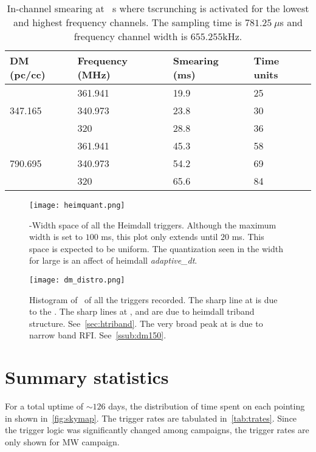 \begin{table}
	\label{tab:dmsmearing}
	\caption{In-channel smearing at \dm~s where tscrunching is activated for the lowest and highest frequency channels. The sampling time is $781.25\ \mu$s and frequency channel width is $655.255$kHz.}
		\begin{tabular}{llll}
			\toprule
			DM (pc/cc)               & Frequency (MHz) & Smearing (ms) & Time units \\
			\midrule
			\multirow{3}{*}{347.165} & 361.941         & 19.9          & 25         \\
															 & 340.973         & 23.8          & 30         \\
															 & 320             & 28.8          & 36         \\ \midrule
			\multirow{3}{*}{790.695} & 361.941         & 45.3          & 58         \\
															 & 340.973         & 54.2          & 69         \\
															 & 320             & 65.6          & 84       \\ 
			\bottomrule
		\end{tabular}
\end{table}

\begin{figure}
	\label{fig:triheimdall}
	\texttt{[image: heimquant.png]}
	\caption{\dm-Width space of all the Heimdall triggers. Although the maximum width is set to $100$ ms, this plot only extends until $20$ ms.
		This space is expected to be uniform. The quantization seen in the width for large \dm is an affect of heimdall \emph{adaptive\_dt}.
	}
\end{figure}

\begin{figure}
	\label{fig:histdm}
	\texttt{[image: dm\_distro.png]}
	\caption{Histogram of \dm~of all the triggers recorded.
		The sharp line at  is due to the .
		The sharp lines at ,  and  are due to heimdall triband structure. See~\autoref{sec:htriband}.
		The very broad peak at  is due to narrow band RFI. See~\autoref{ssub:dm150}.
	}
\end{figure}


\section{Summary statistics}
\label{sec:sum}
\par For a total uptime of $\sim 126$ days, the distribution of time spent on each pointing in shown in~\autoref{fig:skymap}.
The trigger rates are tabulated in~\autoref{tab:trates}. Since the trigger logic was significantly changed among campaigns, the trigger rates are only shown for MW campaign.

